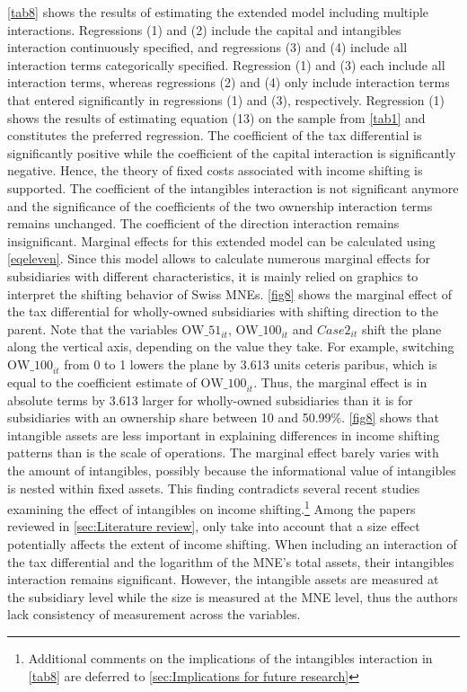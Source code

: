 \documentclass[10pt,twocolumn,oneside,cmyk]{article}
\begin{document}
\cref{tab8} shows the results of estimating the extended model including multiple interactions. Regressions (1) and (2) include the capital and intangibles interaction continuously specified, and regressions (3) and (4) include all interaction terms categorically specified. Regression (1) and (3) each include all interaction terms, whereas regressions (2) and (4) only include interaction terms that entered significantly in regressions (1) and (3), respectively. Regression (1) shows the results of estimating equation (13) on the sample from \cref{tab1} and constitutes the preferred regression. The coefficient of the tax differential is significantly positive while the coefficient of the capital interaction is significantly negative. Hence, the theory of fixed costs associated with income shifting is supported. The coefficient of the intangibles interaction is not significant anymore and the significance of the coefficients of the two ownership interaction terms remains unchanged. The coefficient of the direction interaction remains insignificant. Marginal effects for this extended model can be calculated using \cref{eqeleven}. Since this model allows to calculate numerous marginal effects for subsidiaries with different characteristics, it is mainly relied on graphics to interpret the shifting behavior of Swiss MNEs. \cref{fig8} shows the marginal effect of the tax differential for wholly-owned subsidiaries with shifting direction to the parent. Note that the variables $\text{OW\_51}_{it}$, $\text{OW\_100}_{it}$ and $Case2_{it}$ shift the plane along the vertical axis, depending on the value they take. For example, switching $\text{OW\_100}_{it}$ from 0 to 1 lowers the plane by 3.613 units ceteris paribus, which is equal to the coefficient estimate of $\text{OW\_100}_{it}$. Thus, the marginal effect is in absolute terms by 3.613 larger for wholly-owned subsidiaries than it is for subsidiaries with an ownership share between 10 and 50.99\%. \cref{fig8} shows that intangible assets are less important in explaining differences in income shifting patterns than is the scale of operations. The marginal effect barely varies with the amount of intangibles, possibly because the informational value of intangibles is nested within fixed assets. This finding contradicts several recent studies examining the effect of intangibles on income shifting.\footnote{Additional comments on the implications of the intangibles interaction in \cref{tab8} are deferred to \cref{sec:Implications for future research}} Among the papers reviewed in \cref{sec:Literature review}, only \textcite[436-438]{beer_profit_2015} take into account that a size effect potentially affects the extent of income shifting. When including an interaction of the tax differential and the logarithm of the MNE's total assets, their intangibles interaction remains significant. However, the intangible assets are measured at the subsidiary level while the size is measured at the MNE level, thus the authors lack consistency of measurement across the variables.
\end{document}
